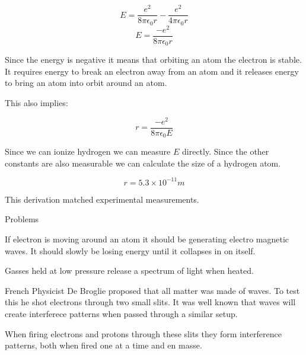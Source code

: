 \documentclass{report}
\begin{document}
\begin{description}
\begin{mdframed}
            \begin{displaymath}
                E = \frac{e^2}{8 \pi \epsilon_0 r} - \frac{e^2}{4 \pi \epsilon_0 r}
            \end{displaymath}
            \begin{displaymath}
                E = \frac{-e^2}{8 \pi \epsilon_0 r}
            \end{displaymath}
            
            Since the energy is negative it means that orbiting an atom
            the electron is stable. It requires energy to break
            an electron away from an atom and it releases energy
            to bring an atom into orbit around an atom.
            
            This also implies:

            \begin{displaymath}
                r = \frac{-e^2}{8 \pi \epsilon_0 E}
            \end{displaymath}

            Since we can ionize hydrogen we can measure $E$
            directly. Since the other constants are also
            measurable we can calculate the size of a hydrogen
            atom.

             \begin{displaymath}
                 r = 5.3 \times 10^{-11} \si{m}
            \end{displaymath}
            
            This derivation matched experimental measurements.
        \end{mdframed}
        Problems
        \begin{mdframed}
            If electron is moving around an atom it should be
            generating electro magnetic waves. It should
            slowly be losing energy until it collapses in
            on itself.

            Gasses held at low pressure release a spectrum of
            light when heated.
        \end{mdframed}
        \begin{mdframed}
            French Physicist De Broglie proposed that all
            matter was made of waves. To test this he
            shot electrons through two small slits. It was
            well known that waves will create interferece
            patterns when passed through a similar setup.

            When firing electrons and protons through these
            slits they form interference patterns, both
            when fired one at a time and en masse.


\end{mdframed}
\end{description}
\end{document}
